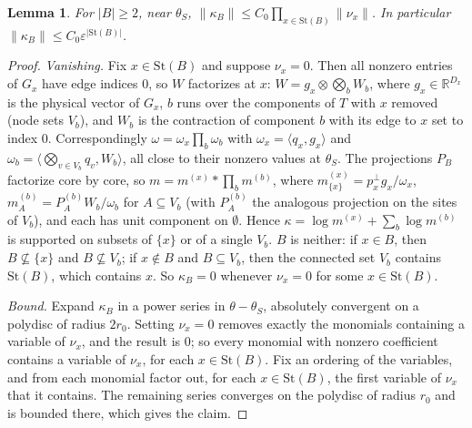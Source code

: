 \documentclass[11pt]{article}
\newtheorem{lemma}{Lemma}
\theoremstyle{definition}
\newcommand{\St}{\mathrm{St}}
\newcommand{\ip}[2]{\langle #1,#2\rangle}
\begin{document}
\begin{lemma}\label{lem:locality}
For $\lvert B\rvert\ge2$, near $\theta_S$, $\lVert\kappa_B\rVert\le C_0\prod_{x\in\St(B)}\lVert\nu_x\rVert$. In particular
$\lVert\kappa_B\rVert\le C_0\varepsilon^{\lvert\St(B)\rvert}$.
\end{lemma}
\begin{proof}
\emph{Vanishing.} Fix $x\in\St(B)$ and suppose $\nu_x=0$. Then all nonzero entries of $G_x$ have edge indices $0$, so $W$
factorizes at $x$: $W=g_x\otimes\bigotimes_bW_b$, where $g_x\in\mathbb R^{D_x}$ is the physical vector of $G_x$, $b$ runs over the
components of $T$ with $x$ removed (node sets $V_b$), and $W_b$ is the contraction of component $b$ with its edge to $x$ set
to index $0$. Correspondingly $\omega=\omega_x\prod_b\omega_b$ with $\omega_x=\ip{q_x}{g_x}$ and $\omega_b=\ip{\bigotimes_{v\in V_b}q_v}{W_b}$, all close
to their nonzero values at $\theta_S$. The projections $P_B$ factorize core by core, so $m=m^{(x)}*\prod_bm^{(b)}$, where
$m^{(x)}_{\{x\}}=p_x^\perp g_x/\omega_x$, $m^{(b)}_A=P^{(b)}_AW_b/\omega_b$ for $A\subseteq V_b$ (with $P^{(b)}_A$ the analogous projection on
the sites of $V_b$), and each has unit component on $\emptyset$. Hence $\kappa=\log m^{(x)}+\sum_b\log m^{(b)}$ is supported on
subsets of $\{x\}$ or of a single $V_b$. $B$ is neither: if $x\in B$, then $B\not\subseteq\{x\}$ and $B\not\subseteq V_b$; if
$x\notin B$ and $B\subseteq V_b$, then the connected set $V_b$ contains $\St(B)$, which contains $x$. So $\kappa_B=0$ whenever
$\nu_x=0$ for some $x\in\St(B)$.

\emph{Bound.} Expand $\kappa_B$ in a power series in $\theta-\theta_S$, absolutely convergent on a polydisc of radius $2r_0$. Setting
$\nu_x=0$ removes exactly the monomials containing a variable of $\nu_x$, and the result is $0$; so every monomial with nonzero
coefficient contains a variable of $\nu_x$, for each $x\in\St(B)$. Fix an ordering of the variables, and from each monomial
factor out, for each $x\in\St(B)$, the first variable of $\nu_x$ that it contains. The remaining series converges on the
polydisc of radius $r_0$ and is bounded there, which gives the claim.
\end{proof}
\end{document}
